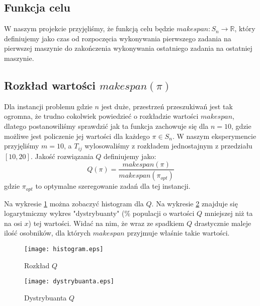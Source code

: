 \documentclass[11pt, a4wide]{article}
\begin{document}
\subsection{Funkcja celu}
W naszym projekcie przyjęliśmy, że funkcją celu będzie  $ makespan : S_n \rightarrow \mathbb{R} $, który
definiujemy jako czas od rozpoczęcia wykonywania pierwszego zadania na pierwszej maszynie do 
zakończenia wykonywania ostatniego zadania na ostatniej maszynie.

\subsection{Rozkład wartości $makespan(\pi)$}
Dla instancji problemu gdzie $n$ jest duże, przestrzeń przeszukiwań jest tak ogromna, że trudno
cokolwiek powiedzieć o rozkładzie wartości $makespan$, dlatego postanowiliśmy sprawdzić jak ta funkcja
zachowuje się dla $n = 10$, gdzie możliwe jest policzenie jej wartości dla każdego $\pi \in S_n$.
W naszym eksperymencie przyjęliśmy $m = 10$, a $T_{ij}$ wylosowaliśmy z rozkładem jednostajnym 
z przedziału $[10, 20]$. Jakość rozwiązania $Q$ definiujemy jako:
$$ Q(\pi) = \frac{makespan(\pi)}{makespan(\pi_{opt})}$$
gdzie $\pi_{opt}$ to optymalne szeregowanie zadań dla tej instancji.

Na wykresie \ref{rozklad} można zobaczyć histogram dla $Q$. Na wykresie \ref{dystrybuanta} znajduje 
się logarytmiczny wykres "dystrybuanty" (\% populacji o wartości $Q$ mniejszej niż ta na osi $x$) tej 
wartości. Widać na nim, że wraz ze spadkiem $Q$ drastycznie maleje ilość osobników, dla których $makespan$
przyjmuje właśnie takie wartości.


\begin{figure}[H]
\caption{Rozkład $Q$}
\label{rozklad}
\begin{center}
  \texttt{[image: histogram.eps]}
\end{center}
\end{figure}

\begin{figure}[H]
\caption{Dystrybuanta $Q$}
\label{dystrybuanta}
\begin{center}
  \texttt{[image: dystrybuanta.eps]}
\end{center}
\end{figure}
\end{document}
